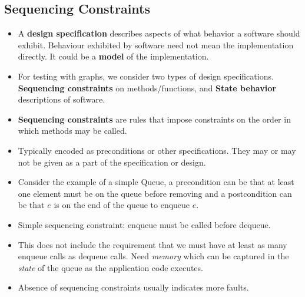 \documentclass[a4paper]{article}
\begin{document}
\subsection{Sequencing Constraints}
\begin{itemize}
    \item A \textbf{design specification} describes aspects of what behavior a software should exhibit. Behaviour exhibited by software need not mean the implementation directly. It could be a \textbf{model} of the implementation.
    \item For testing with graphs, we consider two types of design specifications. \textbf{Sequencing constraints} on methods/functions, and \textbf{State behavior} descriptions of software.
    \item \textbf{Sequencing constraints} are rules that impose constraints on the order in which methods may be called.
    \item Typically encoded as preconditions or other specifications. They may or may not be given as a part of the specification or design.
    \item Consider the example of a simple Queue, a precondition can be that at least one element must be on the queue before removing and a postcondition can be that $e$ is on the end of the queue to enqueue $e$.
    \item Simple sequencing constraint: enqueue must be called before dequeue.
    \item This does not include the requirement that we must have at least as many enqueue calls as dequeue calls. Need \textit{memory} which can be captured in the \textit{state} of the queue as the application code executes.
    \item Absence of sequencing constraints usually indicates more faults.
\end{itemize}
\end{document}
